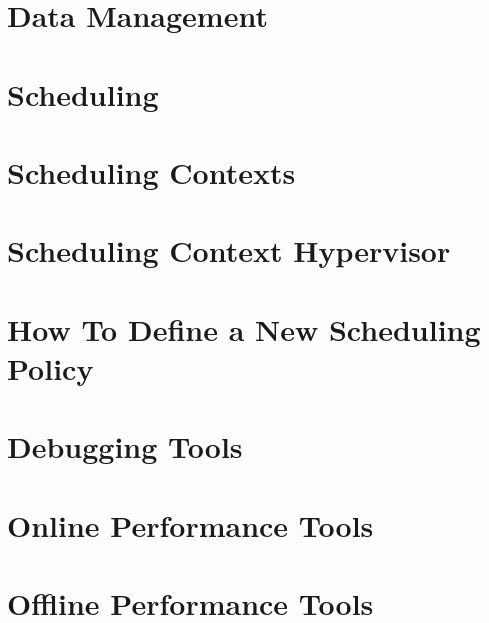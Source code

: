\chapter{Data Management}
\label{DataManagement}
\hypertarget{DataManagement}{}


\chapter{Scheduling}
\label{Scheduling}
\hypertarget{Scheduling}{}


\chapter{Scheduling Contexts}
\label{SchedulingContexts}
\hypertarget{SchedulingContexts}{}


\chapter{Scheduling Context Hypervisor}
\label{SchedulingContextHypervisor}
\hypertarget{SchedulingContextHypervisor}{}


\chapter{How To Define a New Scheduling Policy}
\label{HowToDefineANewSchedulingPolicy}
\hypertarget{HowToDefineANewSchedulingPolicy}{}


\chapter{Debugging Tools}
\label{DebuggingTools}
\hypertarget{DebuggingTools}{}


\chapter{Online Performance Tools}
\label{OnlinePerformanceTools}
\hypertarget{OnlinePerformanceTools}{}


\chapter{Offline Performance Tools}
\label{OfflinePerformanceTools}
\hypertarget{OfflinePerformanceTools}{}


